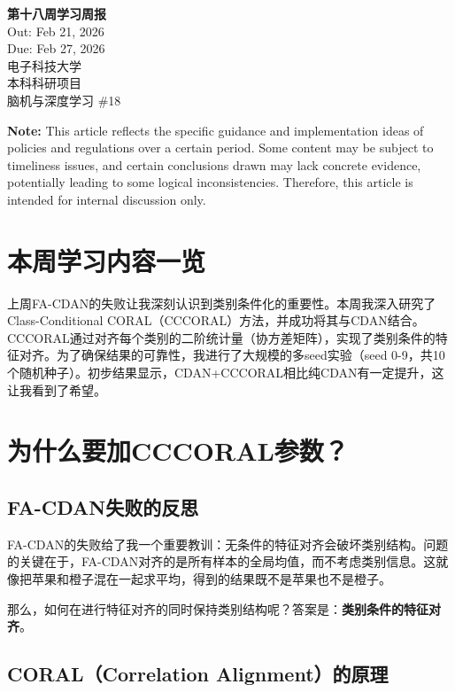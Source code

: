 \documentclass[12pt,a4paper]{ctexart}
\begin{document}
\begin{center}
    {\LARGE \textbf{第十八周学习周报}}\\[0.5cm]
    {\large Out: Feb 21, 2026}\\
    {\large Due: Feb 27, 2026}\\[0.5cm]
    {\large 电子科技大学}\\
    {\large 本科科研项目}\\
    {\large 脑机与深度学习 \#18}
\end{center}

\vspace{1cm}

\noindent \textbf{Note:} This article reflects the specific guidance and implementation ideas of policies and regulations over a certain period. Some content may be subject to timeliness issues, and certain conclusions drawn may lack concrete evidence, potentially leading to some logical inconsistencies. Therefore, this article is intended for internal discussion only.

\section{本周学习内容一览}

上周FA-CDAN的失败让我深刻认识到类别条件化的重要性。本周我深入研究了Class-Conditional CORAL（CCCORAL）方法，并成功将其与CDAN结合。CCCORAL通过对齐每个类别的二阶统计量（协方差矩阵），实现了类别条件的特征对齐。为了确保结果的可靠性，我进行了大规模的多seed实验（seed 0-9，共10个随机种子）。初步结果显示，CDAN+CCCORAL相比纯CDAN有一定提升，这让我看到了希望。

\section{为什么要加CCCORAL参数？}

\subsection{FA-CDAN失败的反思}

FA-CDAN的失败给了我一个重要教训：无条件的特征对齐会破坏类别结构。问题的关键在于，FA-CDAN对齐的是所有样本的全局均值，而不考虑类别信息。这就像把苹果和橙子混在一起求平均，得到的结果既不是苹果也不是橙子。

那么，如何在进行特征对齐的同时保持类别结构呢？答案是：\textbf{类别条件的特征对齐}。

\subsection{CORAL（Correlation Alignment）的原理}
\end{document}
